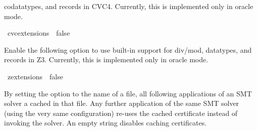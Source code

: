 \begin{isabellebody}
\begin{isamarkuptext}
codatatypes, and records in CVC4. Currently, this is implemented only
in oracle mode.%
\end{isamarkuptext}\isamarkuptrue%
\isamarkupfalse%
\ {\isacharbrackleft}{\kern0pt}{\isacharbrackleft}{\kern0pt}cvc{}{\isacharunderscore}{\kern0pt}extensions\ {\isacharequal}{\kern0pt}\ false{\isacharbrackright}{\kern0pt}{\isacharbrackright}{\kern0pt}%
\begin{isamarkuptext}%
Enable the following option to use built-in support for div/mod, datatypes,
and records in Z3. Currently, this is implemented only in oracle mode.%
\end{isamarkuptext}\isamarkuptrue%
\isamarkupfalse%
\ {\isacharbrackleft}{\kern0pt}{\isacharbrackleft}{\kern0pt}z{}{\isacharunderscore}{\kern0pt}extensions\ {\isacharequal}{\kern0pt}\ false{\isacharbrackright}{\kern0pt}{\isacharbrackright}{\kern0pt}%
\isadelimdocument
%
\endisadelimdocument
%
\isatagdocument
%
\isamarkuptrue%
%
\endisatagdocument
{\isafolddocument}%
%
\isadelimdocument
%
\endisadelimdocument
%
\begin{isamarkuptext}%
By setting the option  to the name of a file,
all following applications of an SMT solver a cached in that file.
Any further application of the same SMT solver (using the very same
configuration) re-uses the cached certificate instead of invoking the
solver. An empty string disables caching certificates.


\end{isamarkuptext}
\end{isabellebody}
